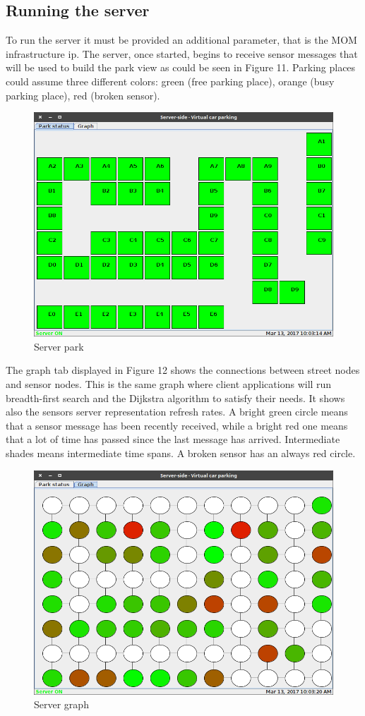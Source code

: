 \documentclass[11pt]{article}
\begin{document}
\subsection{Running the server}
To run the server it must be provided an additional parameter, that is the MOM infrastructure ip. The server, once started, begins to receive sensor messages that will be used to build the park view as could be seen in Figure 11. Parking places could assume three different colors: green (free parking place), orange (busy parking place), red (broken sensor).
\begin{figure}
  \centering
	\includegraphics[scale=0.45]{serverParkScreen}
  \caption{Server park}
\end{figure}
The graph tab displayed in Figure 12 shows the connections between street nodes and sensor nodes. This is the same graph where client applications will run breadth-first search and the Dijkstra algorithm to satisfy their needs. It shows also the sensors server representation refresh rates. A bright green circle means that a sensor message has been recently received, while a bright red one means that a lot of time has passed since the last message has arrived. Intermediate shades means intermediate time spans. A broken sensor has an always red circle. 
\begin{figure}
  \centering
	\includegraphics[scale=0.45]{serverGraphScreen}
  \caption{Server graph}
\end{figure}
\end{document}
